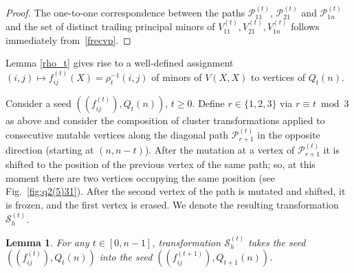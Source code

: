 \documentclass{amsart}
\newtheorem{lemma}[theorem]{Lemma}
\theoremstyle{definition}
\theoremstyle{remark}
\numberwithin{equation}{section}
\numberwithin{theorem}{section}
\begin{document}
\begin{proof}
 The one-to-one correspondence between the paths  ${{\mathcal P}}_{11}^{(t)}$, 
${{\mathcal P}}_{21}^{(t)}$ and ${{\mathcal P}}_{1n}^{(t)}$ and the set of 
distinct trailing principal minors 
of  $V_{11}^{(t)},  V_{21}^{(t)},  V_{1n}^{(t)}$ follows immediately from~\eqref{frecvp}.
\end{proof}

Lemma \ref{rho_t} gives rise to a well-defined assignment $(i,j) \mapsto
f^{(t)}_{ij}(X)=\rho_t^{-1}(i,j)$ of minors of $V(X,X)$ to vertices of $Q_t(n)$.

Consider a seed $((f^{(t)}_{ij}), Q_t(n) )$, $t\geq 0$. Define $r\in\{1,2,3\}$ via $r\equiv t\bmod 3$
as above and 
consider the composition
of cluster transformations applied to consecutive mutable vertices along the diagonal path
${{\mathcal P}}_{r+1}^{(t)}$ in the opposite direction 
(starting  at $(n, n-t)$).  
After the mutation at a vertex of ${{\mathcal P}}_{r+1}^{(t)}$ it is shifted to the position of
the previous vertex of the same path; so, at this moment there are two vertices occupying
the same position (see Fig.~\ref{fig:q2(5)31}).
After the second vertex of the path is mutated and  shifted, it is frozen, and the first vertex is erased.
We denote the resulting transformation $\mathcal S_h^{(t)}$.

\begin{lemma}
\label{Sh} 
For any $t\in [0,n-1]$, transformation $\mathcal S_h^{(t)}$ takes the seed $((f_{ij}^{(t)}), Q_t(n) )$ into
the seed $((f_{ij}^{(t+1)}), Q_{t+1}(n) )$.
\end{lemma}
\end{document}
